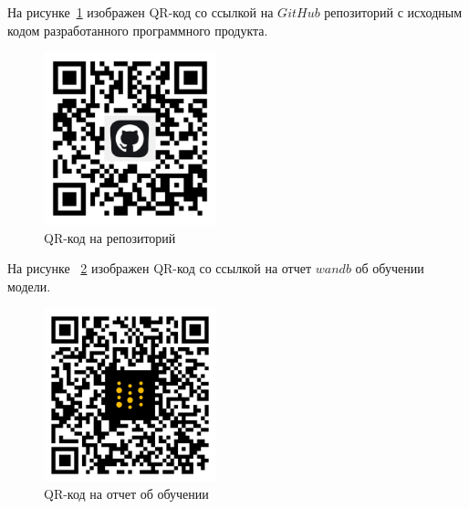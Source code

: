 
На рисунке~\ref{qr_git} изображен QR-код со ссылкой на $GitHub$ репозиторий с исходным кодом разработанного программного продукта.

\begin{figure}
    \includegraphics[width=5cm]{img/qr_git.png}
    \caption{QR-код на репозиторий}
    \label{qr_git}
\end{figure}


На рисунке ~\ref{wandb_qr} изображен QR-код со ссылкой на отчет $wandb$ об обучении модели.

\begin{figure}
    \includegraphics[width=5cm]{img/qr_wandb.png}
    \caption{QR-код на отчет об обучении}
    \label{wandb_qr}
\end{figure}